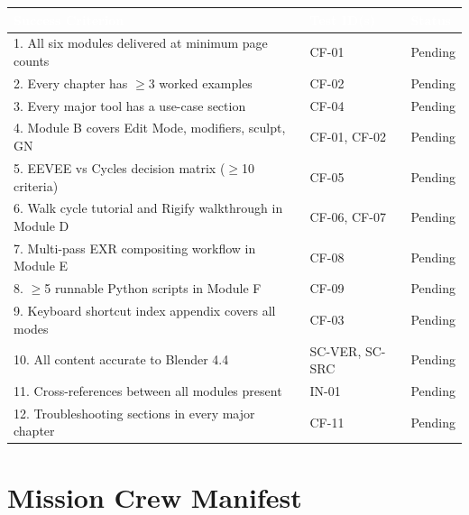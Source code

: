 \documentclass[11pt,letterpaper]{article}
\newcommand{\tableheader}[1]{\textbf{\sffamily\textcolor{white}{#1}}}
\begin{document}
\begin{center}
\begin{tabularx}{\textwidth}{XL{4cm}C{2cm}}
\toprule
{}
\tableheader{Success Criterion} & \tableheader{Test ID(s)} & \tableheader{Status} \\
. All six modules delivered at minimum page counts & CF-01 & Pending \\
2. Every chapter has $\geq$3 worked examples & CF-02 & Pending \\
3. Every major tool has a use-case section & CF-04 & Pending \\
4. Module B covers Edit Mode, modifiers, sculpt, GN & CF-01, CF-02 & Pending \\
5. EEVEE vs Cycles decision matrix ($\geq$10 criteria) & CF-05 & Pending \\
6. Walk cycle tutorial and Rigify walkthrough in Module D & CF-06, CF-07 & Pending \\
7. Multi-pass EXR compositing workflow in Module E & CF-08 & Pending \\
8. $\geq$5 runnable Python scripts in Module F & CF-09 & Pending \\
9. Keyboard shortcut index appendix covers all modes & CF-03 & Pending \\
10. All content accurate to Blender 4.4 & SC-VER, SC-SRC & Pending \\
11. Cross-references between all modules present & IN-01 & Pending \\
12. Troubleshooting sections in every major chapter & CF-11 & Pending \\
\bottomrule
\end{tabularx}
\end{center}

\section{Mission Crew Manifest}
\end{document}
